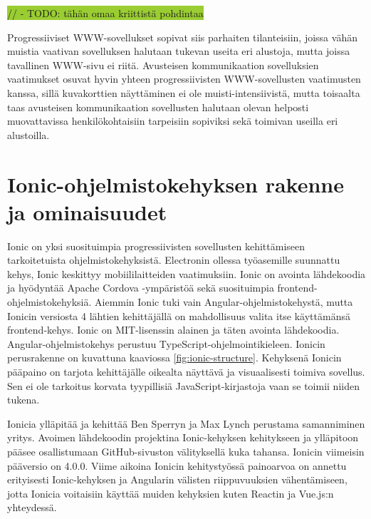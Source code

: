 \documentclass[utf8]{gradu3}
\begin{document}
\colorbox{YellowGreen}{// - TODO: tähän omaa kriittistä pohdintaa}

Progressiiviset WWW-sovellukset sopivat siis parhaiten tilanteisiin, joissa vähän muistia vaativan sovelluksen halutaan tukevan useita eri alustoja, mutta joissa tavallinen WWW-sivu ei riitä. Avusteisen kommunikaation sovelluksien vaatimukset osuvat hyvin yhteen progressiivisten WWW-sovellusten vaatimusten kanssa, sillä kuvakorttien näyttäminen ei ole muisti-intensiivistä, mutta toisaalta taas avusteisen kommunikaation sovellusten halutaan olevan helposti muovattavissa henkilökohtaisiin tarpeisiin sopiviksi sekä toimivan useilla eri alustoilla.

\section{Ionic-ohjelmistokehyksen rakenne ja ominaisuudet}

Ionic on yksi suosituimpia progressiivisten sovellusten kehittämiseen tarkoitetuista ohjelmistokehyksistä. Electronin ollessa työasemille suunnattu kehys, Ionic keskittyy mobiililaitteiden vaatimuksiin. Ionic on avointa lähdekoodia ja hyödyntää Apache Cordova -ympäristöä sekä suosituimpia frontend-ohjelmistokehyksiä. Aiemmin Ionic tuki vain Angular-ohjelmistokehystä, mutta Ionicin versiosta 4 lähtien kehittäjällä on mahdollisuus valita itse käyttämänsä frontend-kehys. Ionic on MIT-lisenssin alainen ja täten avointa lähdekoodia. Angular-ohjelmistokehys perustuu TypeScript-ohjelmointikieleen. Ionicin perusrakenne on kuvattuna kaaviossa \ref{fig:ionic-structure}. Kehyksenä Ionicin pääpaino on tarjota kehittäjälle oikealta näyttävä ja visuaalisesti toimiva sovellus. Sen ei ole tarkoitus korvata tyypillisiä JavaScript-kirjastoja vaan se toimii niiden tukena. \parencite[]{ionic-documentation}

Ionicia ylläpitää ja kehittää Ben Sperryn ja Max Lynch perustama samanniminen yritys. Avoimen lähdekoodin projektina Ionic-kehyksen kehitykseen ja ylläpitoon pääsee osallistumaan GitHub-sivuston välityksellä kuka tahansa. Ionicin viimeisin pääversio on 4.0.0. Viime aikoina Ionicin kehitystyössä painoarvoa on annettu erityisesti Ionic-kehyksen ja Angularin välisten riippuvuuksien vähentämiseen, jotta Ionicia voitaisiin käyttää muiden kehyksien kuten Reactin ja Vue.js:n yhteydessä.
\end{document}
